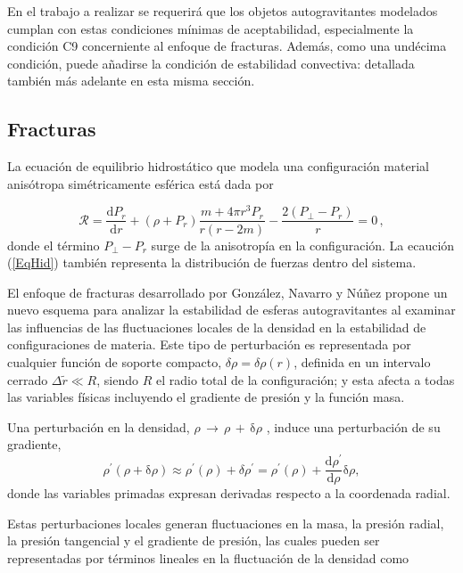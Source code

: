 \documentclass[letterpaper,11pt]{article}
\begin{document}
En el trabajo a realizar se requerirá que los objetos autogravitantes modelados cumplan con estas condiciones mínimas de aceptabilidad, especialmente la condición C9 concerniente al enfoque de fracturas. Además, como una undécima condición, puede añadirse la condición de estabilidad convectiva: detallada también más adelante en esta misma sección. 




\subsection{Fracturas}


La ecuación de equilibrio hidrostático que modela una configuración material anisótropa simétricamente esférica está dada por

\begin{equation}
\label{EqHid}
 \mathcal{R} = \frac{\mathrm{d} P_{r}}{\mathrm{d} r} +(\rho +P_{r})\frac{m + 4 \pi r^{3}P_{r}}{r(r-{2}m)}-\frac{2(P_\perp -P_{r})}{r} = 0 \, ,
\end{equation}
donde el término $ P_\perp -P_{r} $ surge de la anisotropía en la configuración. La ecaución (\ref{EqHid}) también representa la distribución de fuerzas dentro del sistema.

    	
El enfoque de fracturas desarrollado por González, Navarro y Núñez \cite{GonzalezNavarroNunez2015} propone un nuevo esquema para analizar la estabilidad de esferas autogravitantes al examinar las influencias de las fluctuaciones locales de la densidad en la estabilidad de configuraciones de materia. Este tipo de perturbación es representada por cualquier función de soporte compacto, $ \delta \rho = \delta \rho (r)$, definida en un intervalo cerrado $ \Delta \tilde{r} \ll R $, siendo $ R $ el radio total de la configuración; y esta afecta a todas las variables físicas incluyendo el gradiente de presión y la función masa.

Una perturbación en la densidad, $ \rho \, \mathrm{\rightarrow} \, \rho \, {+} \,  \mathrm{\delta} \rho $ , induce una perturbación de su gradiente,
\begin{equation}
\rho^{\prime} (\rho + \mathrm{\delta} \rho) \approx \rho^{\prime} (\rho) + \delta \rho^{\prime} = \rho^{\prime} (\rho) + \frac{\mathrm{d} \rho^{\prime}}{\mathrm{d} \rho} \mathrm{\delta} \rho ,
\end{equation}
donde las variables primadas expresan derivadas respecto a la coordenada radial.

Estas perturbaciones locales generan fluctuaciones en la masa, la presión radial, la presión tangencial y el gradiente de presión, las cuales pueden ser representadas por términos lineales en la fluctuación de la densidad como
\end{document}
